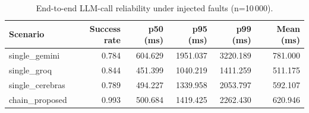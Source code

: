 \begin{table}[t]
\centering
\caption{End-to-end LLM-call reliability under injected faults (n=10\,000).}
\label{tab:reliability}
\begin{tabular}{lrrrrr}
\hline
Scenario & Success rate & p50 (ms) & p95 (ms) & p99 (ms) & Mean (ms) \\
\hline
single\_gemini & 0.784 & 604.629 & 1951.037 & 3220.189 & 781.000 \\
single\_groq & 0.844 & 451.399 & 1040.219 & 1411.259 & 511.175 \\
single\_cerebras & 0.789 & 494.227 & 1339.958 & 2053.797 & 592.107 \\
chain\_proposed & 0.993 & 500.684 & 1419.425 & 2262.430 & 620.946 \\
\hline
\end{tabular}
\end{table}
